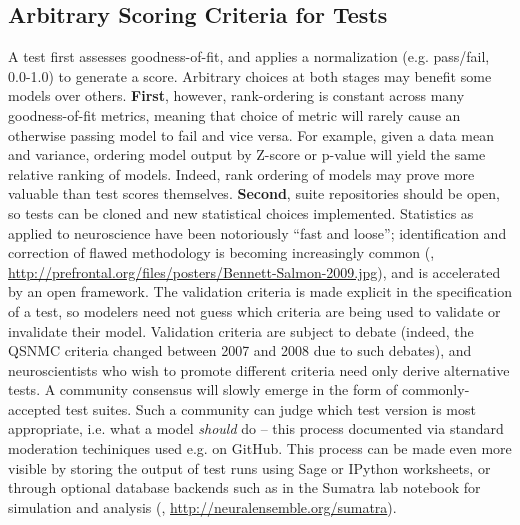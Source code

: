 \documentclass{frontiersSCNS}
\begin{document}
\subsection{Arbitrary Scoring Criteria for Tests}
A test first assesses goodness-of-fit, and applies a normalization (e.g. pass/fail, 0.0-1.0) to generate a score. 
Arbitrary choices at both stages may benefit some models over others. 
\textbf{First}, however, rank-ordering is constant across many goodness-of-fit metrics, meaning that choice of metric will rarely cause an otherwise passing model to fail and vice versa. 
For example, given a data mean and variance, ordering model output by Z-score or p-value will yield the same relative ranking of models. 
Indeed, rank ordering of models may prove more valuable than test scores themselves. 
\textbf{Second}, suite repositories should be open, so tests can be cloned and new statistical choices implemented. 
Statistics as applied to neuroscience have been notoriously ``fast and loose''; 
identification and correction of flawed methodology is becoming increasingly common (\cite{button_power_2013,kriegeskorte_circular_2009,galbraith_study_2010}, \url{http://prefrontal.org/files/posters/Bennett-Salmon-2009.jpg}), and is accelerated by an open framework. 
The validation criteria is made explicit in the specification of a test, so modelers need not guess which criteria are being used to validate or invalidate their model. 
Validation criteria are subject to debate (indeed, the QSNMC criteria changed between 2007 and 2008 due to such debates), and neuroscientists who wish to promote different criteria need only derive alternative tests. 
A community consensus will slowly emerge in the form of commonly-accepted test suites. 
Such a community can judge which test version is most appropriate, i.e. what a model \textit{should} do -- this process documented via standard moderation techiniques used e.g. on GitHub. 
This process can be made even more visible by storing the output of test runs using Sage or IPython worksheets, or through optional database backends such as in the Sumatra lab notebook for simulation and analysis (\cite{sumatra_davison_2012}, \url{http://neuralensemble.org/sumatra}).
\end{document}
